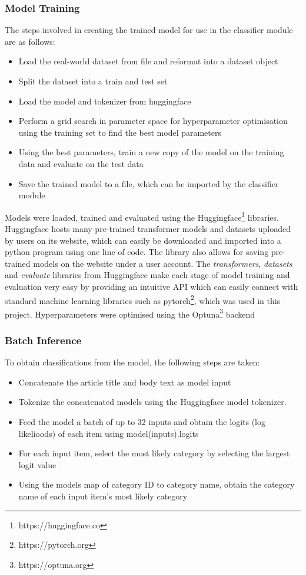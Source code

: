 \documentclass{l4proj}
\begin{document}
\subsubsection{Model Training} \hfill \par
    The steps involved in creating the trained model for use in the classifier module are as follows:
    \begin{itemize}
        \item Load the real-world dataset from file and reformat into a dataset object
        \item Split the dataset into a train and test set
        \item Load the model and tokenizer from huggingface
        \item Perform a grid search in parameter space for hyperparameter optimisation using the training set to find the best model parameters
        \item Using the best parameters, train a new copy of the model on the training data and evaluate on the test data
        \item Save the trained model to a file, which can be imported by the classifier module
    \end{itemize}
    Models were loaded, trained and evaluated using the Huggingface\footnote{https://huggingface.co} libraries. Huggingface hosts many pre-trained transformer models and datasets uploaded by users on its website, which can easily be downloaded and imported into a python program using one line of code. The library also allows for saving pre-trained models on the website under a user account. The \emph{transformers}, \emph{datasets} and \emph{evaluate} libraries from Huggingface make each stage of model training and evaluation very easy by providing an intuitive API which can easily connect with standard machine learning libraries such as pytorch\footnote{https://pytorch.org}, which was used in this project. Hyperparameters were optimised using the Optuna\footnote{https://optuna.org} backend\par
    
\subsubsection{Batch Inference} \hfill \par
    To obtain classifications from the model, the following steps are taken:
    \begin{itemize}
        \item Concatenate the article title and body text as model input
        \item Tokenize the concatenated models using the Huggingface model tokenizer.
        \item Feed the model a batch of up to 32 inputs and obtain the logits (log likelioods) of each item using model(inputs).logits
        \item For each input item, select the most likely category by selecting the largest logit value
        \item Using the models map of category ID to category name, obtain the category name of each input item's most likely category
    \end{itemize}
\end{document}
